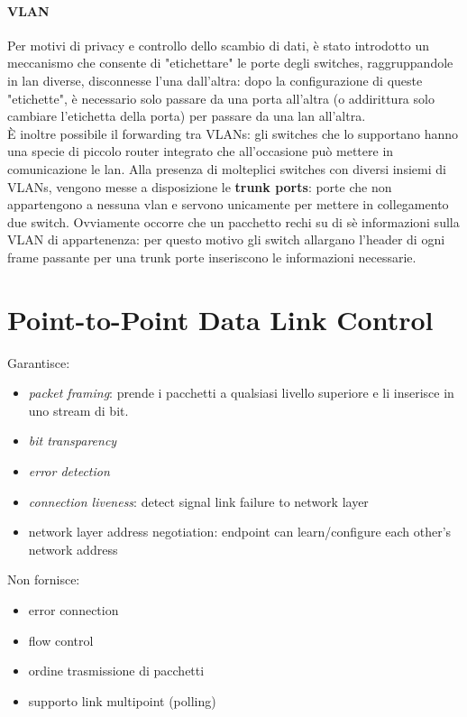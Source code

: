 \paragraph{VLAN}
Per motivi di privacy e controllo dello scambio di dati, è stato introdotto un meccanismo che consente di "etichettare" le porte degli switches, raggruppandole in lan diverse, disconnesse l'una dall'altra: dopo la configurazione di queste "etichette", è necessario solo passare da una porta all'altra (o addirittura solo cambiare l'etichetta della porta) per passare da una lan all'altra.\\
È inoltre possibile il forwarding tra VLANs: gli switches che lo supportano hanno una specie di piccolo router integrato che all'occasione può mettere in comunicazione le lan. Alla presenza di molteplici switches con diversi insiemi di VLANs, vengono messe a disposizione le \textbf{trunk ports}: porte che non appartengono a nessuna vlan e servono unicamente per mettere in collegamento due switch. Ovviamente occorre che un pacchetto rechi su di sè informazioni sulla VLAN di appartenenza: per questo motivo gli switch allargano l'header di ogni frame passante per una trunk porte inseriscono le informazioni necessarie.\\
\newpage
\section{Point-to-Point Data Link Control}
Garantisce:
\begin{itemize}
	\item \textit{packet framing}: prende i pacchetti a qualsiasi livello superiore e li inserisce in uno stream di bit.
	\item \textit{bit transparency}
	\item \textit{error detection}
	\item \textit{connection liveness}: detect signal link failure to network layer
	\item network layer address negotiation: endpoint can learn/configure each other's network address	
\end{itemize}
Non fornisce:
\begin{itemize}
	\item error connection
	\item flow control
	\item ordine trasmissione di pacchetti
	\item supporto link multipoint (polling)
\end{itemize}

